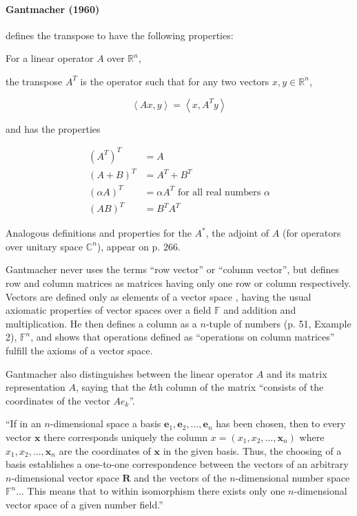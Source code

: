 \paragraph{Gantmacher (1960)~\cite{Gantmacher1960}}

\cite[p. 280, Definition 10]{Gantmacher1960} defines the transpose to have the following properties:

For a linear operator $A$ over $\mathbb R^n$,

the transpose $A^T$ is the operator such that for any two vectors $x, y \in \mathbb R^n$,

\[
\left\langle Ax, y \right\rangle = \left\langle x, A^T y \right\rangle
\]

and has the properties

\begin{align}
(A^T)^T & = A \\
(A + B)^T & = A^T + B^T \\
(\alpha A)^T & = \alpha A^T \textrm{ for all real numbers } \alpha \\
(A B)^T & = B^T A^T
\end{align}

Analogous definitions and properties for the $A^*$, the adjoint of $A$ (for operators over unitary space $\mathbb C^n$), appear on p. 266.

Gantmacher never uses the terms ``row vector'' or ``column vector'', but defines row and column matrices as matrices having only one row or column respectively. Vectors are defined only as elements of a vector space \cite[p. 51]{Gantmacher1960}, having the usual axiomatic properties of vector spaces over a field $\mathbb F$ and addition and multiplication. He then defines a column as a $n$-tuple of numbers (p. 51, Example 2), $\mathbb F^n$, and shows that operations defined as ``operations on column matrices'' fulfill the axioms of a vector space.

Gantmacher also distinguishes \cite[pp. 54-56]{Gantmacher1960} between the linear operator $A$ and its matrix representation $A$, saying that the $k$th column of the matrix ``consists of the coordinates of the vector $Ae_k$''.

``If in an $n$-dimensional space a basis $\mathbf e_1, \mathbf e_2, \dots, \mathbf e_n$ has been chosen, then to every vector $\mathbf x$ there corresponds uniquely the column $x = (x_1, x_2, \dots, \mathbf x_n)$ where $x_1, x_2, \dots, \mathbf x_n$ are the coordinates of $\mathbf x$ in the given basis. Thus, the choosing of a basis establishes a one-to-one correspondence between the vectors of an arbitrary $n$-dimensional vector space $\mathbf R$ and the vectors of the $n$-dimensional number space $\mathbb F^n$... This means that to within isomorphism there exists only one $n$-dimensional vector space of a given number field.''

